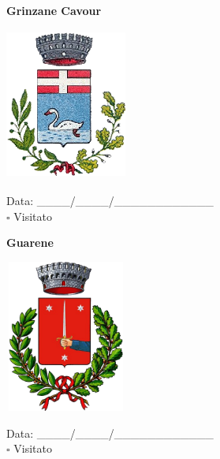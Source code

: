 \documentclass[a5paper,12pt]{article}
\begin{document}
\vspace{0.7cm}

\noindent
\begin{minipage}[t]{0.45\textwidth}
    \begin{center}
        \textbf{Grinzane Cavour}
    \end{center}
    \vspace{-0.5cm} %
    \begin{center}
        \includegraphics[height= 5cm, width=4cm]{Piemonte/Stemma Grinzane Cavour.png}
    \end{center}
    \vspace{-0.4cm} %
    \begin{flushleft}
        Data: \_\_\_\_/\_\_\_\_/\_\_\_\_\_\_\_\_\_\_\_\_ \\
        $\square$ Visitato
    \end{flushleft}
\end{minipage}
\hfill
\noindent
\begin{minipage}[t]{0.45\textwidth}
    \begin{center}
        \textbf{Guarene}
    \end{center}
    \vspace{-0.5cm} %
    \begin{center}
        \includegraphics[height= 5cm, width=4cm]{Piemonte/Stemma Guarene.png}
    \end{center}
    \vspace{-0.4cm} %
    \begin{flushleft}
        Data: \_\_\_\_/\_\_\_\_/\_\_\_\_\_\_\_\_\_\_\_\_ \\
        $\square$ Visitato
    \end{flushleft}
\end{minipage}
\end{document}
